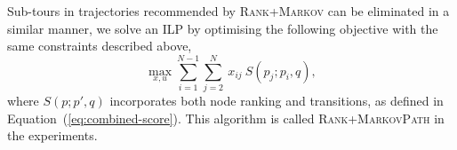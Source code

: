 Sub-tours in trajectories recommended by \textsc{Rank+Markov} can be eliminated in a similar manner,
we solve an ILP by optimising the following objective 
with the same constraints described above,
\eqmoveup
\eqmoveup
\eqmoveup
\begin{equation}
\label{eq:obj2}
\max_{x,u} \sum_{i=1}^{N-1} \sum_{j=2}^N ~x_{ij} ~S(p_j; p_i, q),
\end{equation}
where $S(p;p',q)$ incorporates both node ranking and transitions, as defined in Equation~(\ref{eq:combined-score}).
This algorithm is called \textsc{Rank+MarkovPath} in the experiments.



